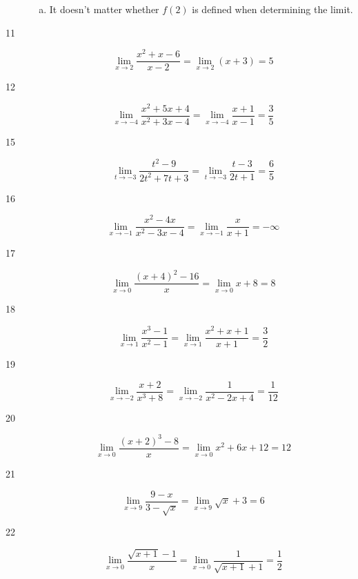 \documentclass[letterpaper]{exam}
\begin{document}
\begin{description}
\begin{enumerate}[(a)]
          \item It doesn't matter whether $f(2)$ is defined when determining the
            limit.
        \end{enumerate}

      \item[11]
        \[
          \lim_{x \to 2} \frac{x^2 + x - 6}{x - 2} 
            = \lim_{x \to 2} (x + 3) = \boxed{ 5 } 
        \]

      \item[12]
        \[
          \lim_{x \to -4} \frac{x^2+5 x+4}{x^2+3 x-4} 
            = \lim_{x \to -4} \frac{x+1}{x-1} = \boxed{ \frac{3}{5} } 
        \]

      \item[15]
        \[
          \lim_{t \to -3} \frac{t^2-9}{2 t^2+7 t+3}            
            = \lim_{t \to -3} \frac{t-3}{2 t+1} = \boxed{ \frac{6}{5} } 
        \]

      \item[16]
        \[
          \lim_{x \to -1} \frac{x^2-4 x}{x^2-3 x-4} 
            = \lim_{x \to -1} \frac{x}{x+1} = \boxed{ -\infty } 
        \]

      \item[17]
        \[
          \lim_{x \to 0} \frac{(x+4)^2-16}{x} 
            = \lim_{x \to 0} x + 8 = \boxed{ 8 } 
        \]

      \item[18]
        \[
          \lim_{x \to 1} \frac{x^3-1}{x^2-1} 
            = \lim_{x \to 1} \frac{x^2+x+1}{x+1} = \boxed{ \frac{3}{2} } 
        \]

      \item[19]
        \[
          \lim_{x \to -2} \frac{x+2}{x^3+8} 
            = \lim_{x \to -2} \frac{1}{x^2-2 x+4} = \boxed{ \frac{1}{12} } 
        \]

      \item[20]
        \[
          \lim_{x \to 0} \frac{(x+2)^3-8}{x} 
            = \lim_{x \to 0} x^2+6 x+12 = \boxed{ 12 } 
        \]

      \item[21]
        \[
          \lim_{x \to 9} \frac{9-x}{3-\sqrt{x}} 
            = \lim_{x \to 9} \sqrt{x}+3 = \boxed{ 6 } 
        \]

      \item[22]
        \[
          \lim_{x \to 0} \frac{\sqrt{x+1}-1}{x} 
            = \lim_{x \to 0} \frac{1}{\sqrt{x + 1} + 1} 
            = \boxed{ \frac{1}{2} } 
        \]


\end{description}
\end{document}
